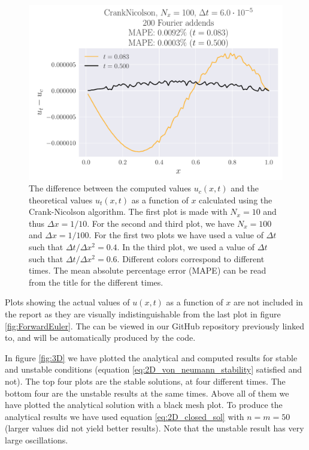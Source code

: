 \documentclass[reprint, english,notitlepage,nofootinbib]{revtex4-1}  %
\begin{document}
\begin{figure}
  \includegraphics[width=\linewidth]{CrankNicolson-Nt8333-dt6_0e-05-Nx100-Error.pdf}
  \caption{The difference between the computed values \(u_c(x, t)\) and the theoretical values \(u_t(x, t)\) as a function of \(x\) calculated using the Crank-Nicolson algorithm. The first plot is made with \(N_x = 10\) and thus \(\Delta x = 1/10\). For the second and third plot, we have \(N_x = 100\) and \(\Delta x = 1/100\). For the first two plots we have used a value of \(\Delta t\) such that \(\Delta t / \Delta x^2 = 0.4\). In the third plot, we used a value of \(\Delta t\) such that \(\Delta t / \Delta x^2 = 0.6\). Different colors correspond to different times. The mean absolute percentage error (MAPE) can be read from the title for the different times.}
  \label{fig:CrankNicolson_error}
\end{figure}

Plots showing the actual values of \(u(x, t)\) as a function of \(x\) are not included in the report as they are visually indistinguishable from the last plot in figure \ref{fig:ForwardEuler}. The can be viewed in our GitHub repository previously linked to, and will be automatically produced by the code.

In figure \ref{fig:3D} we have plotted the analytical and computed results for stable and unstable conditions (equation \eqref{eq:2D_von_neumann_stability} satisfied and not). The top four plots are the stable solutions, at four different times. The bottom four are the unstable results at the same times. Above all of them we have plotted the analytical solution with a black mesh plot. To produce the analytical results we have used equation \eqref{eq:2D_closed_sol} with $n = m = 50$ (larger values did not yield better results). Note that the unstable result has very large oscillations.
\end{document}
